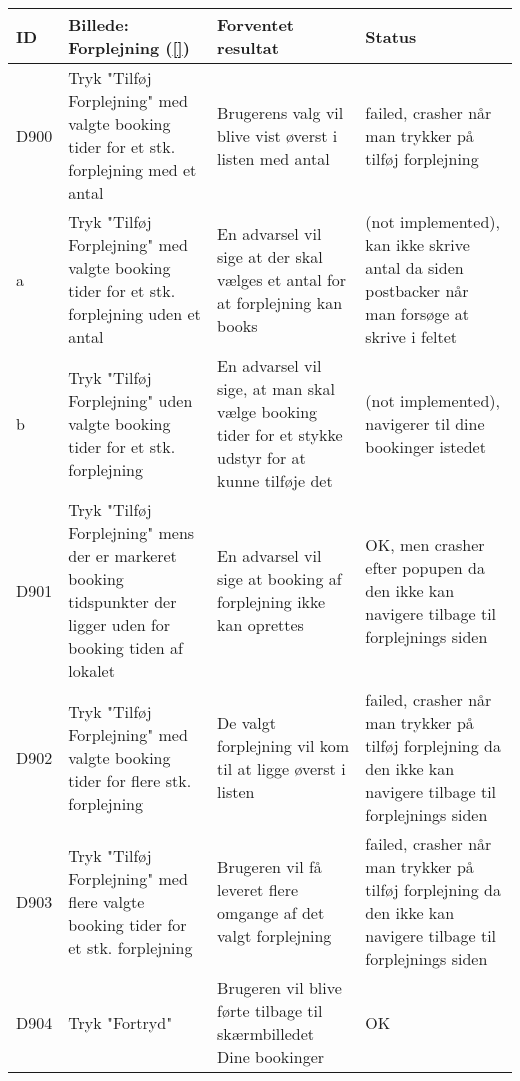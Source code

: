 \begin{longtable}{ |p{0.85cm}| p{7cm} | p{7.15cm} | p{1cm} | }
\hline
ID & Billede: Forplejning (\ref{})  & Forventet resultat & Status\\ 
\hline
D900 & Tryk "Tilføj Forplejning" med valgte booking tider for et stk. forplejning med et antal & Brugerens valg vil blive vist øverst i listen med antal & failed, crasher når man trykker på tilføj forplejning \\
\hline
a & Tryk "Tilføj Forplejning" med valgte booking tider for et stk. forplejning uden et antal & En advarsel vil sige at der skal vælges et antal for at forplejning kan books &(not implemented), kan ikke skrive antal da siden postbacker når man forsøge at skrive i feltet \\
\hline
b & Tryk "Tilføj Forplejning" uden valgte booking tider for et stk. forplejning & En advarsel vil sige, at man skal vælge booking tider for et stykke udstyr for at kunne tilføje det &(not implemented), navigerer til dine bookinger istedet \\
\hline
D901 & Tryk "Tilføj Forplejning" mens der er markeret booking tidspunkter der ligger uden for booking tiden af lokalet & En advarsel vil sige at booking af forplejning ikke kan oprettes & OK, men crasher efter popupen da den ikke kan navigere tilbage til forplejnings siden \\
\hline
D902 & Tryk "Tilføj Forplejning" med valgte booking tider for flere stk. forplejning & De valgt forplejning vil kom til at ligge øverst i listen & failed, crasher når man trykker på tilføj forplejning da den ikke kan navigere tilbage til forplejnings siden \\
\hline
D903 & Tryk "Tilføj Forplejning" med flere valgte booking tider for et stk. forplejning & Brugeren vil få leveret flere omgange af det valgt forplejning & failed, crasher når man trykker på tilføj forplejning da den ikke kan navigere tilbage til forplejnings siden\\
\hline
D904 & Tryk "Fortryd" & Brugeren vil blive førte tilbage til skærmbilledet Dine bookinger & OK \\
\hline
\end{longtable}

